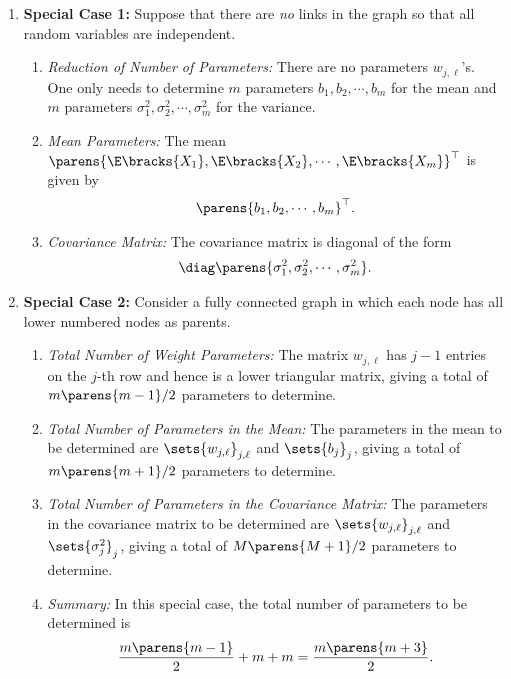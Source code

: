 \documentclass[12pt]{article}
\begin{document}
\begin{enumerate}[label=\textbf{\arabic*.}]
	\item \textbf{Special Case 1:} Suppose that there are \emph{no} links in the graph so that all random variables are independent. 
	\begin{enumerate}
		\item \textit{Reduction of Number of Parameters:} There are no parameters $w_{j, \ell}$'s. One only needs to determine $m$ parameters $b_1, b_2, \cdots, b_m$ for the mean and $m$ parameters $\sigma_1^2, \sigma_2^2, \cdots, \sigma_m^2$ for the variance. 
		\item \textit{Mean Parameters:} The mean $\parens{\E \bracks{X_1}, \E \bracks{X_2}, \cdots, \E \bracks{X_m}}^\top$ is given by  
		\begin{align*}
			\parens{b_1, b_2, \cdots, b_m}^\top. 
		\end{align*}
		\item \textit{Covariance Matrix:} The covariance matrix is diagonal of the form 
		\begin{align*}
			\diag \parens{\sigma_1^2, \sigma_2^2, \cdots, \sigma_m^2}. 
		\end{align*}
	\end{enumerate}
	
	\item \textbf{Special Case 2:} Consider a fully connected graph in which each node has all lower numbered nodes as parents. 
	\begin{enumerate}
		\item \textit{Total Number of Weight Parameters:} The matrix $w_{j, \ell}$ has $j - 1$ entries on the $j$-th row and hence is a lower triangular matrix, giving a total of $m \parens{m - 1}/2$ parameters to determine. 
		\item \textit{Total Number of Parameters in the Mean:} The parameters in the mean to be determined are $\sets{w_{j, \ell}}_{j, \ell}$ and $\sets{b_j}_j$, giving a total of $m \parens{m + 1}/2$ parameters to determine. 
		\item \textit{Total Number of Parameters in the Covariance Matrix:} The parameters in the covariance matrix to be determined are $\sets{w_{j, \ell}}_{j, \ell}$ and $\sets{\sigma_j^2}_j$, giving a total of $M \parens{M + 1}/2$ parameters to determine. 
		\item \textit{Summary:} In this special case, the total number of parameters to be determined is 
		\begin{align*}
			\frac{m \parens{m-1}}{2} + m + m = \frac{m \parens{m + 3}}{2}. 
		\end{align*}
	\end{enumerate}
	

\end{enumerate}
\end{document}
